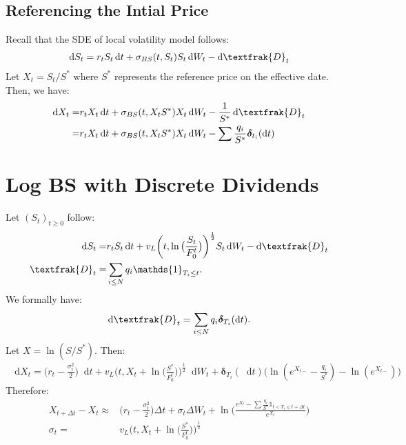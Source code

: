 \documentclass[a4paper, 11pt]{article}              %
\numberwithin{equation}{section}
\theoremstyle{plain}
\newcommand{\1}{\mathds{1}}
\newcommand{\frD}{\textfrak{D}}
\newcommand{\SUM}{\displaystyle\sum}
\theoremstyle{plain}
\theoremstyle{definition}
\theoremstyle{plain}
\newcommand*\df{\mathop{}\!\mathrm{d}}
\begin{document}
\subsection{Referencing the Intial Price}
Recall that the SDE of local volatility model follows:
\begin{align}
  \df S_t = r_tS_t\df t + \sigma_{BS}(t, S_t)S_t\df W_t - \df \frD_t
\end{align}
Let $X_t = S_t / S^*$ where $S^*$ represents the reference price on the
effective date. Then, we have:
\begin{align}
  \df X_t =& r_tX_t\df t + \sigma_{BS}(t, X_tS^*)X_t\df W_t - \frac{1}{S^*}\df
             \frD_t \nonumber \\
  =& r_tX_t\df t + \sigma_{BS}(t, X_tS^*)X_t\df W_t - \SUM \frac{q_i}{S^*}\bm{\delta}_{t_i}(\df t)
\end{align}
\section{Log BS with Discrete Dividends}
Let $(S_t)_{t \geq 0}$ follow:
\begin{align}
  \df S_t =& r_tS_t \df t +  v_L\bigg(t,
             \ln\big(\frac{S_t}{F^t_0}\big)\bigg)^{\frac{1}{2}} S_t \df W_t
             - \df \frD_t \nonumber\\
  \frD_t =& \SUM_{i \leq N}q_i \1_{T_i \leq t}. \nonumber
\end{align}
We formally have:
\begin{align}
  \df \frD_t = \SUM_{i \leq N} q_i \bm{\delta}_{T_i}(\df t).
\end{align}
Let $X = \ln (S / S^*)$. Then:
\begin{align}
  \df X_t =  \big(r_t - \frac{\sigma_t^2}{2}\big) \df t
  +v_L\bigg(t, X_t+\ln\big(\frac{S^*}{F^t_0}\big)\bigg)^{\frac{1}{2}} \df W_t
  +\bm{\delta}_{T_i}(\df t)\big(\ln(e^{X_{t-}}-\frac{q_i}{S^*}) - \ln(e^{X_{t-}})\big) 
\end{align}
Therefore:
\begin{align}
  X_{t+\Delta t} - X_t \approx&
   \big(r_t -
  \frac{\sigma_t^2}{2}\big) \Delta t
  +\sigma_t \Delta W_t
  + \ln\Big(\frac{e^{X_t} - \SUM \frac{q_i}{S^*} \1_{t < T_i \leq t + \Delta
                                t}}{e^{X_t}}\Big) \nonumber\\
  \sigma_t = &v_L\bigg(t, X_t+\ln\big(\frac{S^*}{F^t_0}\big)\bigg)^{\frac{1}{2}} \nonumber
\end{align}

\end{document}
